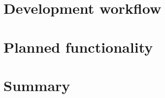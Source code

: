 \documentclass[12pt,preprint]{aastex}
\begin{document}


\section{Development workflow}




\section{Planned functionality}



\section{Summary}

\end{document}
